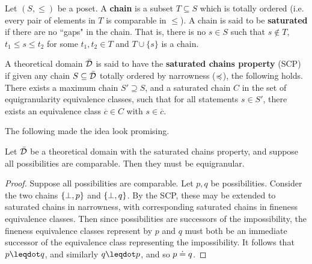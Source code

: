 \documentclass[10pt, onecolumn, longbibliography, nofootinbib]{revtex4-2}
\begin{document}
\begin{defn}
Let $(S,\leq)$ be a poset. A \textbf{chain} is a subset $T\subseteq S$ which is totally ordered (i.e. every pair of elements in $T$ is comparable in $\leq$). A chain is said to be \textbf{saturated} if there are no ``gaps" in the chain. That is, there is no $s \in S$ such that $s \notin T$, $t_1 \leq s \leq t_2$ for some $t_1, t_2 \in T$ and $T \cup \{s\}$ is a chain. 
\end{defn}

\begin{defn}
A theoretical domain $\bar{\mathcal{D}}$ is said to have the \textbf{saturated chains property} (SCP) if given any chain $S\subseteq\bar{\mathcal{D}}$ totally ordered by narrowness ($\preccurlyeq$), the following holds. There exists a maximum chain $S'\supseteq S$, and a saturated chain $C$ in the set of equigranularity equivalence classes, such that for all statements $s \in S'$, there exists an equivalence class $\overline{c}\in C$ with $s\in \overline{c}$.
\end{defn}

The following made the idea look promising.

\begin{prop}\label{chainimpliesuniform}
Let $\bar{\mathcal{D}}$ be a theoretical domain with the saturated chains property, and suppose all possibilities are comparable. Then they must be equigranular.
\end{prop}
\begin{proof}
Suppose all possibilities are comparable. Let $p,q$ be possibilities. Consider the two chains $\{\bot, p\}$ and $\{\bot, q\}$. By the SCP, these may be extended to saturated chains in narrowness, with corresponding saturated chains in fineness equivalence classes. Then since possibilities are successors of the impossibility, the fineness equivalence classes represent by $p$ and $q$ must both be an immediate successor of the equivalence class representing the impossibility. It follows that $p\finer q$, and similarly $q\finer p$, and so $p\doteq q$. 
\end{proof}
\end{document}
